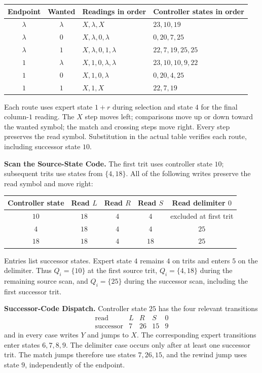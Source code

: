 \documentclass[11pt,a4paper]{article}
\newcommand{\blank}{\lambda}
\begin{document}
\begin{center}
\small\renewcommand{\arraystretch}{1.35}
\begin{tabular}{c c l l}
\toprule\rowcolor{Pale}Endpoint & Wanted & Readings in order & Controller states in order\\\midrule
$\blank$ & $\blank$ & $X,\blank,X$ & $23,10,19$\\
$\blank$ & $0$ & $X,\blank,0,\blank$ & $0,20,7,25$\\
$\blank$ & $1$ & $X,\blank,0,1,\blank$ & $22,7,19,25,25$\\
$1$ & $\blank$ & $X,1,0,\blank,\blank$ & $23,10,10,9,22$\\
$1$ & $0$ & $X,1,0,\blank$ & $0,20,4,25$\\
$1$ & $1$ & $X,1,X$ & $22,7,19$\\
\bottomrule
\end{tabular}
\end{center}
Each route uses expert state $1+r$ during selection and state $4$ for
the final column-$1$ reading. The $X$ step moves left; comparisons
move up or down toward the wanted symbol; the match and crossing steps
move right. Every step preserves the read symbol. Substitution in the actual table
verifies each route, including successor state $10$.

\textbf{Scan the Source-State Code.}
The first trit uses controller state $10$; subsequent trits use states
from $\{4,18\}$. All of the following writes preserve the read symbol and move right:
\begin{center}
\small\renewcommand{\arraystretch}{1.3}
\begin{tabular}{c cccc}
\toprule\rowcolor{Pale}Controller state & Read $L$ & Read $R$ & Read $S$ & Read delimiter $0$\\\midrule
$10$ & $18$ & $4$ & $4$ & excluded at first trit\\
$4$ & $18$ & $4$ & $4$ & $25$\\
$18$ & $18$ & $4$ & $18$ & $25$\\
\bottomrule
\end{tabular}
\end{center}
Entries list successor states. Expert state $4$ remains $4$ on trits and
enters $5$ on the delimiter. Thus $Q_i=\{10\}$ at the first source trit, $Q_i=\{4,18\}$ during the
remaining source scan, and $Q_i=\{25\}$ during the successor scan, including
the first successor trit.

\textbf{Successor-Code Dispatch.}
Controller state $25$ has the four relevant transitions
\[
\begin{array}{c|cccc}
\text{read}&L&R&S&0\\\hline
\text{successor}&7&26&15&9
\end{array}
\]
and in every case writes $Y$ and jumps to $X$. The corresponding expert transitions enter states $6,7,8,9$. The delimiter case occurs only after at least one
successor trit. The match jumps therefore use states $7,26,15$, and the rewind jump
uses state $9$, independently of the endpoint.
\end{document}
